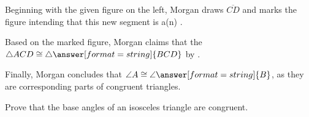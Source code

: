 \documentclass[nooutcomes]{ximera}
\begin{document}
\begin{problem}
Beginning with the given figure on the left, Morgan draws $\overline{CD}$ and marks the figure intending that this new segment is a(n) .

Based on the marked figure, Morgan claims that the $\triangle ACD\cong \triangle\answer[format=string]{BCD}$ by . 

Finally, Morgan concludes that $\angle A\cong \angle\answer[format=string]{B}$, as they are corresponding parts of congruent triangles. 
 
\end{problem}

\begin{problem}
Prove that the base angles of an isosceles triangle are congruent.   


\end{problem}
\end{document}
